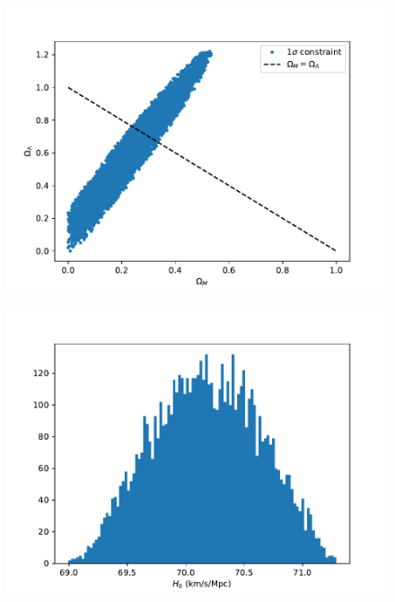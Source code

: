 \documentclass{aa}
\begin{document}
\begin{figure}[ht]
\centering
\includegraphics[width=\hsize]{figures/fitting.pdf}
  \caption{}
     \label{}
\end{figure}

\begin{figure}[ht]
\centering
\includegraphics[width=\hsize]{figures/histogram.pdf}
  \caption{}
     \label{}
\end{figure}
\end{document}
